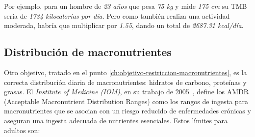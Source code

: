 Por ejemplo, para un hombre de \textit{23 años} que pesa \textit{75 kg} y mide \textit{175 cm} su TMB sería de \textit{1734 kilocalorías por día}. Pero como también realiza una actividad moderada, habría que multiplicar por \textit{1.55}, dando un total de \textit{2687.31 kcal/día}.

\subsection{Distribución de macronutrientes}
\label{ch:distribucion-macronutrientes}

Otro objetivo, tratado en el punto \ref{ch:objetivo-restriccion-macronutrientes}, es la correcta distribución diaria de macronutrientes: hidratos de carbono, proteínas y grasas. El \textit{Institute of Medicine (IOM)}, en su trabajo de 2005~\cite{iom2005}, define los AMDR (Acceptable Macronutrient Distribution Ranges) como los rangos de ingesta para macronutrientes que se asocian con un riesgo reducido de enfermedades crónicas y aseguran una ingesta adecuada de nutrientes esenciales. Estos límites para adultos son:


